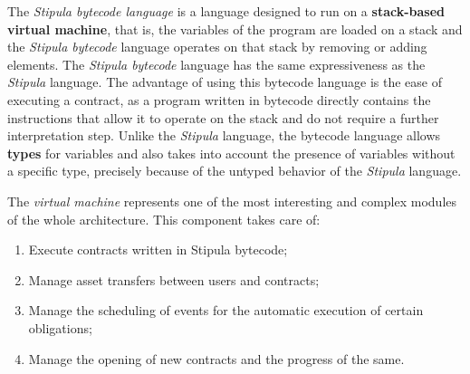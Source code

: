 The \textit{Stipula bytecode language} is a language designed to run on a 
\textbf{stack-based virtual machine}, that is, the variables of the program are loaded on a stack and the 
\textit{Stipula bytecode} language operates on that stack by removing or adding elements. The 
\textit{Stipula bytecode} language has the same expressiveness as the \textit{Stipula} language. The 
advantage of using this bytecode language is the ease of executing a contract, as a program written in 
bytecode directly contains the instructions that allow it to operate on the stack and do not require a 
further interpretation step. Unlike the \textit{Stipula} language, the bytecode language allows 
\textbf{types} for variables and also takes into account the presence of variables without a specific 
type, precisely because of the untyped behavior of the \textit{Stipula} language.

The \textit{virtual machine} represents one of the most interesting and complex modules of the whole 
architecture. This component takes care of:
\begin{enumerate}
	\item Execute contracts written in Stipula bytecode;
	\item Manage asset transfers between users and contracts;
	\item Manage the scheduling of events for the automatic execution of certain obligations;
	\item Manage the opening of new contracts and the progress of the same.
\end{enumerate}

